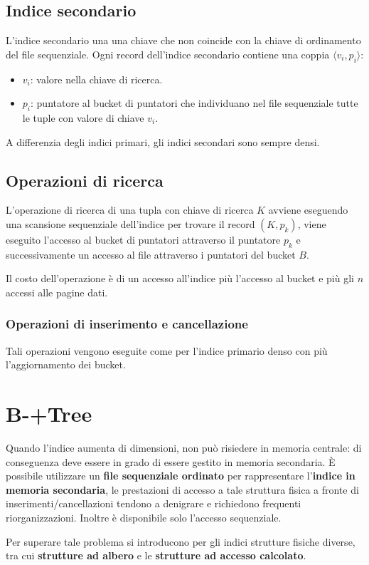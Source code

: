 \documentclass[oneside,a4paper,11pt]{book}
\theoremstyle{italicstyle}
\theoremstyle{normStyle}
\begin{document}
\subsection{Indice secondario}
L'indice secondario una una chiave che non coincide con la chiave di ordinamento del file 
sequenziale. Ogni record dell'indice secondario contiene una coppia $\langle v_i,p_i\rangle$:
\begin{itemize}
    \item $v_i$: valore nella chiave di ricerca.
    \item $p_i$: puntatore al bucket di puntatori che individuano nel file 
    sequenziale tutte le tuple con valore di chiave $v_i$.
\end{itemize}
A differenzia degli indici primari, gli indici secondari sono sempre densi.
\subsection{Operazioni di ricerca}
L'operazione di ricerca di una tupla con chiave di ricerca $K$ avviene eseguendo 
una scansione sequenziale dell'indice per trovare il record $(K,p_k)$, viene eseguito 
l'accesso al bucket di puntatori attraverso il puntatore $p_k$ e successivamente un accesso al file 
attraverso i puntatori del bucket $B$.

Il costo dell'operazione è di un accesso all'indice più l'accesso al bucket e più 
gli $n$ accessi alle pagine dati.
\subsubsection{Operazioni di inserimento e cancellazione}
Tali operazioni vengono eseguite come per l'indice primario denso con più 
l'aggiornamento dei bucket.
\section{B-+Tree} 
Quando l'indice aumenta di dimensioni, non può risiedere in memoria centrale: di conseguenza
deve essere in grado di essere gestito in memoria secondaria. È possibile utilizzare 
un \textbf{file sequenziale ordinato} per rappresentare l'\textbf{indice in memoria 
secondaria}, le prestazioni di accesso a tale struttura fisica a fronte di inserimenti/cancellazioni 
tendono a denigrare e richiedono frequenti riorganizzazioni. Inoltre è disponibile solo 
l'accesso sequenziale.

Per superare tale problema si introducono per gli indici strutture fisiche diverse, tra cui 
\textbf{strutture ad albero} e le \textbf{strutture ad accesso calcolato}.
\end{document}
